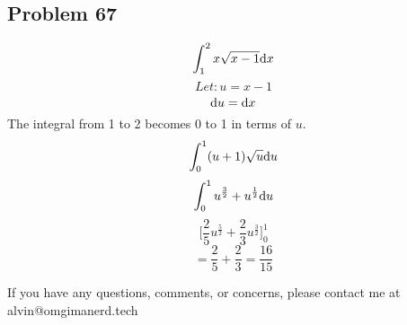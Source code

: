 \documentclass[letterpaper, 12pt]{math}
\begin{document}
\subsection*{Problem 67}
\[ \int_{1}^{2} x \sqrt{x - 1} \mathrm{d}{x} \]
\[ Let: u = x - 1 \]
\[ \mathrm{d}{u} = \mathrm{d}{x} \]
The integral from 1 to 2 becomes 0 to 1 in terms of \( u \).
\[ \int_{0}^{1} (u + 1)\sqrt{u} \mathrm{d}{u} \]
\[ \int_{0}^{1} u^\frac{3}{2} + u^\frac{1}{2} \mathrm{d}{u} \]
\[ \bigg[ \frac{2}{5}u^{\frac{5}{2}} + \frac{2}{3}u^{\frac{3}{2}} \bigg]_0^1 \]
\[ = \frac{2}{5} + \frac{2}{3} = \frac{16}{15} \]

\begin{center}
  If you have any questions, comments, or concerns, please contact me at
  alvin@omgimanerd.tech
\end{center}
\end{document}
